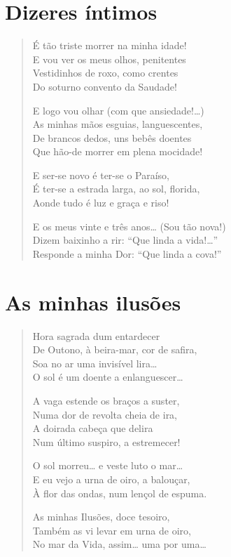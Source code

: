 \chapter{Dizeres íntimos}

\begin{verse}
É tão triste morrer na minha idade!\\
E vou ver os meus olhos, penitentes\\
Vestidinhos de roxo, como crentes\\
Do soturno convento da Saudade! 

E logo vou olhar (com que ansiedade!\ldots{})\\
As minhas mãos esguias, languescentes,\\
De brancos dedos, uns bebês doentes\\
Que hão-de morrer em plena mocidade! 

E ser-se novo é ter-se o Paraíso,\\
É ter-se a estrada larga, ao sol, florida,\\
Aonde tudo é luz e graça e riso!

E os meus vinte e três anos\ldots{} (Sou tão nova!)\\
Dizem baixinho a rir: “Que linda a vida!\ldots{}”\\
Responde a minha Dor: “Que linda a cova!” 
\end{verse}

\chapter{As minhas ilusões}

\begin{verse}
Hora sagrada dum entardecer\\
De Outono, à beira-mar, cor de safira,\\
Soa no ar uma invisível lira\ldots{}\\
O sol é um doente a enlanguescer\ldots{}

A vaga estende os braços a suster,\\
Numa dor de revolta cheia de ira,\\
A doirada cabeça que delira\\
Num último suspiro, a estremecer!

O sol morreu\ldots{} e veste luto o mar\ldots{}\\
E eu vejo a urna de oiro, a balouçar,\\
À flor das ondas, num lençol de espuma.

As minhas Ilusões, doce tesoiro,\\
Também as vi levar em urna de oiro,\\
No mar da Vida, assim\ldots{} uma por uma\ldots{} 
\end{verse}

